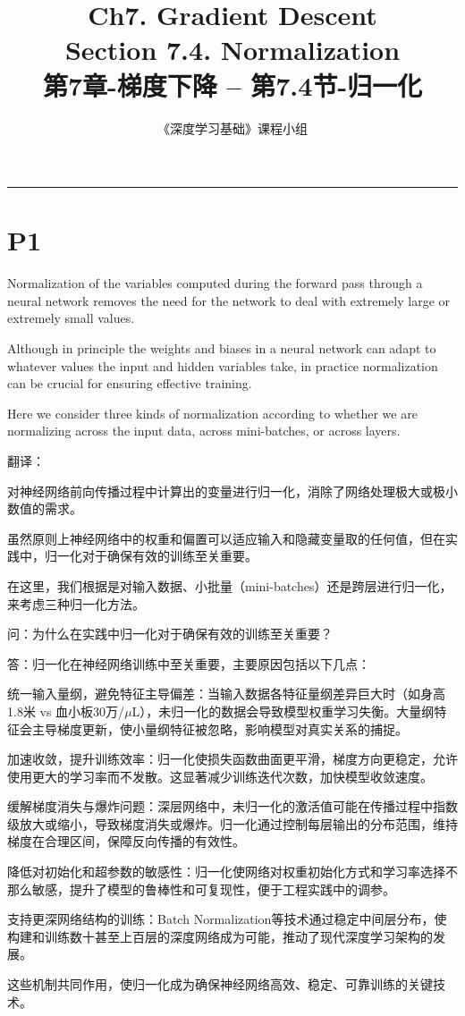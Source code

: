 \documentclass{article}
\title{Ch7. Gradient Descent \\ 
Section 7.4. Normalization \\
第7章-梯度下降 -- 第7.4节-归一化}
\author{《深度学习基础》课程小组}
\begin{document}
\maketitle

\setlength{\parindent}{0pt} %
\setlength{\parskip}{1.5em} %

\noindent\rule{\linewidth}{0.4pt}

\section{P1}

Normalization of the variables computed during the forward pass through a neural network removes the need for the network to deal with extremely large or extremely small values. 

Although in principle the weights and biases in a neural network can adapt to whatever values the input and hidden variables take, in practice normalization can be crucial for ensuring effective training. 

Here we consider three kinds of normalization according to whether we are normalizing across the input data, across mini-batches, or across layers.

{\color{red}
翻译：

对神经网络前向传播过程中计算出的变量进行归一化，消除了网络处理极大或极小数值的需求。

虽然原则上神经网络中的权重和偏置可以适应输入和隐藏变量取的任何值，但在实践中，归一化对于确保有效的训练至关重要。

在这里，我们根据是对输入数据、小批量（mini-batches）还是跨层进行归一化，来考虑三种归一化方法。
}

{\color{blue}
问：为什么在实践中归一化对于确保有效的训练至关重要？

答：归一化在神经网络训练中至关重要，主要原因包括以下几点：

统一输入量纲，避免特征主导偏差：当输入数据各特征量纲差异巨大时（如身高1.8米 vs 血小板30万/$\mu$L），未归一化的数据会导致模型权重学习失衡。大量纲特征会主导梯度更新，使小量纲特征被忽略，影响模型对真实关系的捕捉。

加速收敛，提升训练效率：归一化使损失函数曲面更平滑，梯度方向更稳定，允许使用更大的学习率而不发散。这显著减少训练迭代次数，加快模型收敛速度。

缓解梯度消失与爆炸问题：深层网络中，未归一化的激活值可能在传播过程中指数级放大或缩小，导致梯度消失或爆炸。归一化通过控制每层输出的分布范围，维持梯度在合理区间，保障反向传播的有效性。

降低对初始化和超参数的敏感性：归一化使网络对权重初始化方式和学习率选择不那么敏感，提升了模型的鲁棒性和可复现性，便于工程实践中的调参。

支持更深网络结构的训练：Batch Normalization等技术通过稳定中间层分布，使构建和训练数十甚至上百层的深度网络成为可能，推动了现代深度学习架构的发展。

这些机制共同作用，使归一化成为确保神经网络高效、稳定、可靠训练的关键技术。
}
\end{document}
